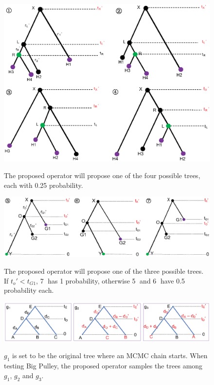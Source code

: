 \documentclass{bmcart}
\begin{document}
\begin{backmatter}
\begin{figure}[h!]
\includegraphics[width=12cm]{Fig06-symmetric.eps}\\
\caption{
             The proposed operator will propose one of the four possible trees, each with 0.25 probability.}
\label{symmetric}
\end{figure}

\begin{figure}[h!]
\includegraphics[width=12cm]{Fig07-asymmetric.eps}\\
\caption{
             The proposed operator will propose one of the three possible trees. If ${t_o}' < t_{G1}$, \textcircled7 has 1 probability, otherwise \textcircled5 and \textcircled6 have 0.5 probability each.}
\label{asymmetric}
\end{figure}

\begin{figure}[h!]
\includegraphics[width=12cm]{Fig08-sampleprior.eps}\\
\caption{
             $g_1$ is set to be the original tree where an MCMC chain starts. When testing Big Pulley, the proposed operator samples the trees among $g_1$, $g_2$ and $g_3$.}
\label{sampleprior}
\end{figure}


\end{backmatter}
\end{document}

